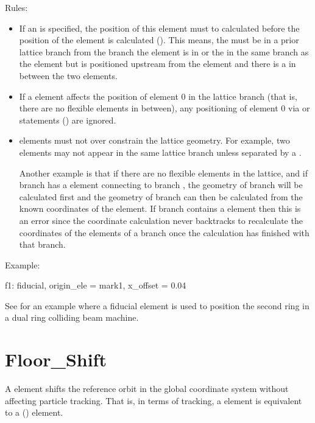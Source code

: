 Rules: 
  \begin{itemize}
  \item
If an  is specified, the position of this element must to calculated before the
position of the  element is calculated (). This means, the 
must be in a prior lattice branch from the branch the  element is in or the
 in the same branch as the  element but is positioned upstream from the
 element and there is a   in between the two elements.
  \item
If a  element affects the position of element 0 in the lattice branch (that is, there
are no flexible  elements in between), any positioning of element 0 via  or
 statements () are ignored.
  \item
{} elements must not over constrain the lattice geometry.  For example, two 
elements may not appear in the same lattice branch unless separated by a  .

Another example is that if there are no flexible  elements in the lattice, and if branch
 has a  element connecting to branch , the geometry of branch  will be
calculated first and the geometry of branch  can then be calculated from the known coordinates
of the  element. If branch  contains a  element then this is an error
since the coordinate calculation never backtracks to recalculate the coordinates of the elements of
a branch once the calculation has finished with that branch.
  \end{itemize}

Example:
\begin{example}
  f1: fiducial, origin_ele = mark1, x_offset = 0.04
\end{example}
See  for an example where a fiducial element is
used to position the second ring in a dual ring colliding beam 
machine.

\section{Floor_Shift}
\label{s:floor.ele}

A  element shifts the reference orbit in the global coordinate system without
affecting particle tracking. That is, in terms of tracking, a  element is equivalent
to a  () element. 

